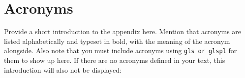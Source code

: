 \chapter{Acronyms}
\label{app:acronyms}

Provide a short introduction to the appendix here. Mention that acronyms are
listed alphabetically and typeset in bold, with the meaning of the acronym
alongside. Also note that you must include acronyms using \texttt{gls or glspl}
for them to show up here. If there are no acronyms defined in your text, this
introduction will also not be displayed:

\printacronyms

